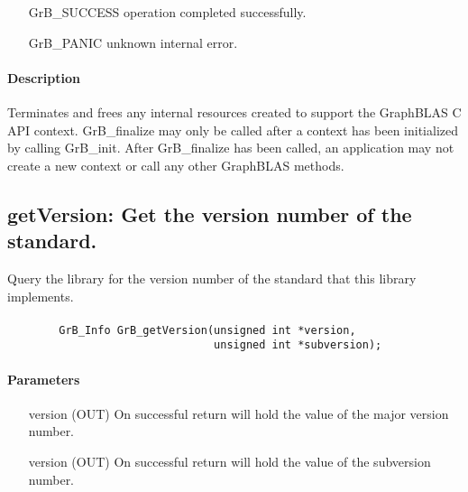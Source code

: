 \begin{itemize}[leftmargin=2.1in]
\item[{\sf GrB\_SUCCESS}]        operation completed successfully.
\item[{\sf GrB\_PANIC}]          unknown internal error.
\end{itemize}

\paragraph{Description}

Terminates and frees any internal resources created to support the
GraphBLAS C API context.  {\sf GrB\_finalize} may only be called after
a context has been initialized by calling {\sf GrB\_init}.  After {\sf GrB\_finalize}
has been called, an application may not create a new context or call any other
GraphBLAS methods.


\subsection{{\sf getVersion}: Get the version number of the standard.}

Query the library for the version number of the standard that this library
implements.

\paragraph{\syntax}

\begin{verbatim}
        GrB_Info GrB_getVersion(unsigned int *version,
                                unsigned int *subversion);
\end{verbatim}


\paragraph{Parameters}

\begin{itemize}[leftmargin=1.1in]
	\item[{\sf version}] ({\sf OUT})  On successful return will hold the value
    of the major version number.
	\item[{\sf version}] ({\sf OUT})  On successful return will hold the value
    of the subversion number.
\end{itemize}


